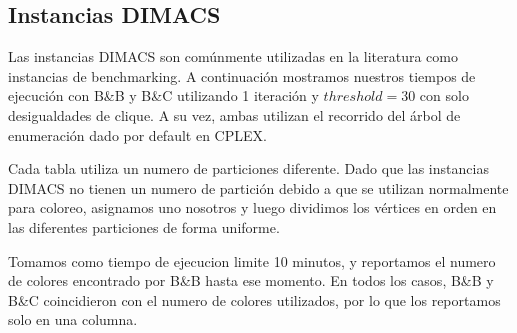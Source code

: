 \subsection{Instancias DIMACS}

Las instancias DIMACS son comúnmente utilizadas en la literatura como instancias de benchmarking. A continuación mostramos nuestros tiempos de ejecución con B\&B y B\&C utilizando 1 iteración y $threshold = 30$ con solo desigualdades de clique. A su vez, ambas utilizan el recorrido del árbol de enumeración dado por default en CPLEX.

Cada tabla utiliza un numero de particiones diferente. Dado que las instancias DIMACS no tienen un numero de partición debido a que se utilizan normalmente para coloreo, asignamos uno nosotros y luego dividimos los vértices en orden en las diferentes particiones de forma uniforme.

Tomamos como tiempo de ejecucion limite 10 minutos, y reportamos el numero de colores encontrado por B\&B hasta ese momento. En todos los casos, B\&B y B\&C coincidieron con el numero de colores utilizados, por lo que los reportamos solo en una columna.

